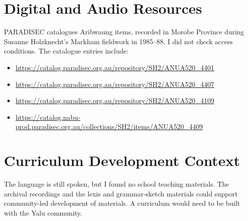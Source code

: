 \documentclass[12pt]{article}
\begin{document}
\section{Digital and Audio Resources}
PARADISEC catalogues Aribwaung items, recorded in Morobe Province during Susanne Holzknecht's Markham fieldwork in 1985--88. I did not check access conditions. The catalogue entries include:
\begin{itemize}
\item \url{https://catalog.paradisec.org.au/repository/SH2/ANUA520_4401}
\item \url{https://catalog.paradisec.org.au/repository/SH2/ANUA520_4407}
\item \url{https://catalog.paradisec.org.au/repository/SH2/ANUA520_4109}
\item \url{https://catalog.nabu-prod.paradisec.org.au/collections/SH2/items/ANUA520_4409}
\end{itemize}

\section{Curriculum Development Context}
The language is still spoken, but I found no school teaching materials. The archival recordings and the lexis and grammar-sketch materials could support community-led development of materials. A curriculum would need to be built with the Yalu community.
\end{document}
